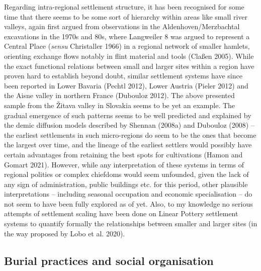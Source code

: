 \documentclass[
  12pt,
  a4paper, twoside]{book}
\begin{document}
Regarding intra-regional settlement structure, it has been recognised for some time that there seems to be some sort of hierarchy within areas like small river valleys, again first argued from observations in the Aldenhoven/Merzbachtal excavations in the 1970s and 80s, where Langweiler 8 was argued to represent a Central Place (\emph{sensu} Christaller 1966) in a regional network of smaller hamlets, orienting exchange flows notably in flint material and tools (Claßen 2005). While the exact functional relations between small and larger sites within a region have proven hard to establish beyond doubt, similar settlement systems have since been reported in Lower Bavaria (Pechtl 2012), Lower Austria (Pieler 2012) and the Aisne valley in northern France (Dubouloz 2012). The above presented sample from the Žitava valley in Slovakia seems to be yet an example. The gradual emergence of such patterns seems to be well predicted and explained by the demic diffusion models described by Shennan (2008a) and Dubouloz (2008) -- the earliest settlements in such micro-regions do seem to be the ones that become the largest over time, and the lineage of the earliest settlers would possibly have certain advantages from retaining the best spots for cultivations (Hamon and Gomart 2021). However, while any interpretation of these systems in terms of regional polities or complex chiefdoms would seem unfounded, given the lack of any sign of administration, public buildings etc. for this period, other plausible interpretations -- including seasonal occupation and economic specialisation -- do not seem to have been fully explored as of yet. Also, to my knowledge no serious attempts of settlement scaling have been done on Linear Pottery settlement systems to quantify formally the relationships between smaller and larger sites (in the way proposed by Lobo et al. 2020).

\hypertarget{burial-practices-and-social-organisation}{%
\subsection{Burial practices and social organisation}\label{burial-practices-and-social-organisation}}
\end{document}
